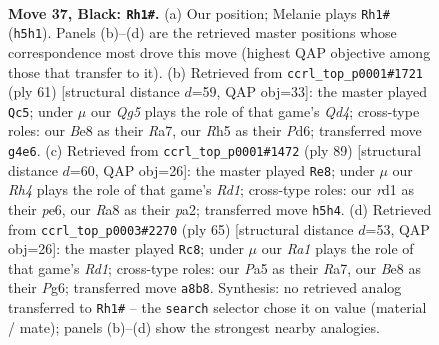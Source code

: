 \documentclass[11pt]{article}
\begin{document}
\clearpage

\begin{figure}[p]\centering
\begin{subfigure}{0.46\textwidth}\centering
\resizebox{\linewidth}{!}{%
\newchessgame
\chessboard[
  setfen={r3b1k1/p4pP1/8/p6r/4p1q1/PP6/1Q3P2/3RRK2 b - - 5 37},
  showmover=false,
  pgfstyle=straightmove, color=movearrow, markmove={h5-h1}
]}
\caption{}
\end{subfigure}\hfill
\begin{subfigure}{0.46\textwidth}\centering
\resizebox{\linewidth}{!}{%
\newchessgame
\chessboard[
  setfen={5r1k/r5pp/1p1p4/p2q4/4R3/PP2Q3/5PPP/5RK1 b - - 0 31},
  showmover=false,
  pgfstyle=straightmove, color=movearrow, markmove={d5-c5}
]}
\caption{}
\end{subfigure}
\\[4pt]
\begin{subfigure}{0.46\textwidth}\centering
\resizebox{\linewidth}{!}{%
\newchessgame
\chessboard[
  setfen={3r3k/4q2p/1pp1P3/2b3R1/1pP3Q1/6P1/P2p3P/3R3K b - - 1 45},
  showmover=false,
  pgfstyle=straightmove, color=movearrow, markmove={d8-e8}
]}
\caption{}
\end{subfigure}\hfill
\begin{subfigure}{0.46\textwidth}\centering
\resizebox{\linewidth}{!}{%
\newchessgame
\chessboard[
  setfen={3r2k1/r3qp1p/6p1/4P3/pP3Q2/2P5/6PP/R4RK1 b - - 4 33},
  showmover=false,
  pgfstyle=straightmove, color=movearrow, markmove={d8-c8}
]}
\caption{}
\end{subfigure}
\caption{\textbf{Move 37, Black: \texttt{Rh1\#}.} (a) Our position; Melanie plays \texttt{Rh1\#} (\texttt{h5h1}). Panels (b)--(d) are the retrieved master positions whose correspondence most drove this move (highest QAP objective among those that transfer to it). (b) Retrieved from \texttt{ccrl\_top\_p0001\#1721} (ply 61) [structural distance $d$=59, QAP obj=33]: the master played \texttt{Qc5}; under $\mu$ our \emph{Qg5} plays the role of that game's \emph{Qd4}; cross-type roles: our \emph{B}e8 as their \emph{R}a7, our \emph{R}h5 as their \emph{P}d6; transferred move \texttt{g4e6}. (c) Retrieved from \texttt{ccrl\_top\_p0001\#1472} (ply 89) [structural distance $d$=60, QAP obj=26]: the master played \texttt{Re8}; under $\mu$ our \emph{Rh4} plays the role of that game's \emph{Rd1}; cross-type roles: our \emph{r}d1 as their \emph{p}e6, our \emph{R}a8 as their \emph{p}a2; transferred move \texttt{h5h4}. (d) Retrieved from \texttt{ccrl\_top\_p0003\#2270} (ply 65) [structural distance $d$=53, QAP obj=26]: the master played \texttt{Rc8}; under $\mu$ our \emph{Ra1} plays the role of that game's \emph{Rd1}; cross-type roles: our \emph{P}a5 as their \emph{R}a7, our \emph{B}e8 as their \emph{P}g6; transferred move \texttt{a8b8}. Synthesis: no retrieved analog transferred to \texttt{Rh1\#} -- the \texttt{search} selector chose it on value (material / mate); panels (b)--(d) show the strongest nearby analogies.}
\label{fig:thought-m73}
\end{figure}
\end{document}
